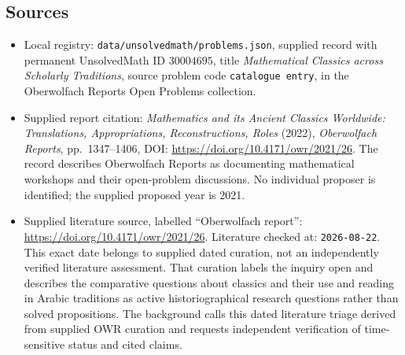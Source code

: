 \documentclass[11pt]{article}
\begin{document}
\subsection{Sources}
\begin{itemize}
\item Local registry: \texttt{data/unsolvedmath/problems.json}, supplied record with permanent UnsolvedMath ID \(30004695\), title \emph{Mathematical Classics across Scholarly Traditions}, source problem code \texttt{catalogue entry}, in the Oberwolfach Reports Open Problems collection.
\item Supplied report citation: \emph{Mathematics and its Ancient Classics Worldwide: Translations, Appropriations, Reconstructions, Roles} (2022), \emph{Oberwolfach Reports}, pp.~1347--1406, DOI: \url{https://doi.org/10.4171/owr/2021/26}. The record describes Oberwolfach Reports as documenting mathematical workshops and their open-problem discussions. No individual proposer is identified; the supplied proposed year is 2021.
\item Supplied literature source, labelled ``Oberwolfach report'': \url{https://doi.org/10.4171/owr/2021/26}. Literature checked at: \texttt{2026-08-22}. This exact date belongs to supplied dated curation, not an independently verified literature assessment. That curation labels the inquiry open and describes the comparative questions about classics and their use and reading in Arabic traditions as active historiographical research questions rather than solved propositions. The background calls this dated literature triage derived from supplied OWR curation and requests independent verification of time-sensitive status and cited claims.
\end{itemize}
\end{document}
